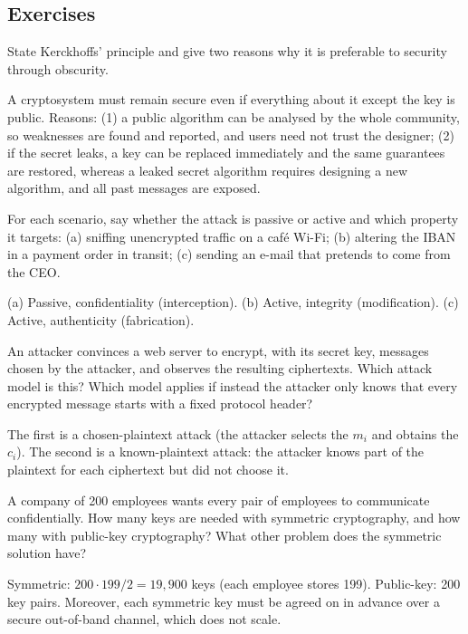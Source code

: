 \subsection*{Exercises}

\begin{exercise}
State Kerckhoffs' principle and give two reasons why it is preferable to security through obscurity.
\end{exercise}
\begin{solution}
A cryptosystem must remain secure even if everything about it except the key is public. Reasons: (1) a public algorithm can be analysed by the whole community, so weaknesses are found and reported, and users need not trust the designer; (2) if the secret leaks, a key can be replaced immediately and the same guarantees are restored, whereas a leaked secret algorithm requires designing a new algorithm, and all past messages are exposed.
\end{solution}

\begin{exercise}
For each scenario, say whether the attack is passive or active and which property it targets: (a) sniffing unencrypted traffic on a café Wi-Fi; (b) altering the IBAN in a payment order in transit; (c) sending an e-mail that pretends to come from the CEO.
\end{exercise}
\begin{solution}
(a) Passive, confidentiality (interception). (b) Active, integrity (modification). (c) Active, authenticity (fabrication).
\end{solution}

\begin{exercise}
An attacker convinces a web server to encrypt, with its secret key, messages chosen by the attacker, and observes the resulting ciphertexts. Which attack model is this? Which model applies if instead the attacker only knows that every encrypted message starts with a fixed protocol header?
\end{exercise}
\begin{solution}
The first is a chosen-plaintext attack (the attacker selects the $m_i$ and obtains the $c_i$). The second is a known-plaintext attack: the attacker knows part of the plaintext for each ciphertext but did not choose it.
\end{solution}

\begin{exercise}
A company of 200 employees wants every pair of employees to communicate confidentially. How many keys are needed with symmetric cryptography, and how many with public-key cryptography? What other problem does the symmetric solution have?
\end{exercise}
\begin{solution}
Symmetric: $200 \cdot 199 / 2 = 19{,}900$ keys (each employee stores 199). Public-key: 200 key pairs. Moreover, each symmetric key must be agreed on in advance over a secure out-of-band channel, which does not scale.
\end{solution}

